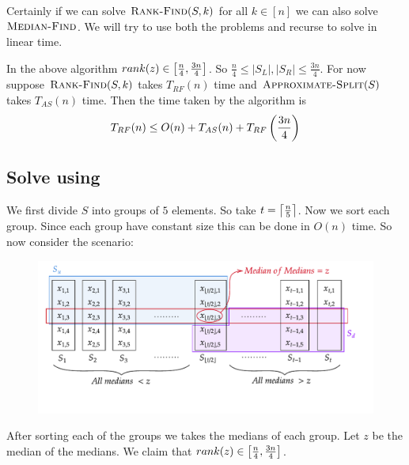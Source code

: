 Certainly if we can solve $\textsc{Rank-Find}(S,k)$ for all $k\in[n]$ we can also solve $\textsc{Median-Find}$. We will try to use both the problems and recurse to solve  in linear time. 

In the above algorithm $rank(z)\in \left[\frac{n}{4},\frac{3n}{4}\right]$. So $\frac{n}4\leq |S_L|,|S_R|\leq \frac{3n}4$. For now suppose $\textsc{Rank-Find}(S,k)$ takes $T_{RF}(n)$ time and $\textsc{Approximate-Split}(S)$ takes $T_{AS}(n)$ time. Then the time taken by the algorithm is  $$T_{RF}(n)\leq O(n)+T_{AS}(n)+T_{RF}\left(\frac{3n}4\right)$$
\subsection{Solve  using }
We first divide $S$ into groups of $5$ elements. So take $t=\left\lceil\frac{n}5\right\rceil$. Now we sort each group. Since each group have constant size this can be done in $O(n)$ time. So now consider the scenario:
\begin{figure}[h]
	\centering
	\includegraphics{images/approx-split-using-rankfind}
\end{figure}

After sorting each of the groups we takes the medians of each group. Let $z$ be the median of the medians. We claim that $rank(z)\in  \left[\frac{n}{4},\frac{3n}{4}\right]$. 

\begin{algorithm}
	\DontPrintSemicolon
\caption{$(S)$}
\end{algorithm}

